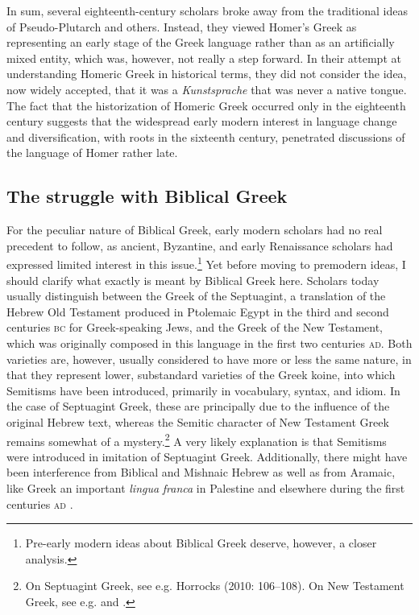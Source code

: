 \documentclass[output=paper]{langsci/langscibook}
\begin{document}
In sum, several eighteenth-century scholars broke away from the traditional ideas of Pseudo-Plutarch and others. Instead, they viewed Homer’s Greek as representing an early stage of the Greek language rather than as an artificially mixed entity, which was, however, not really a step forward. In their attempt at understanding Homeric Greek in historical terms, they did not consider the idea, now widely accepted, that it was a \textit{Kunstsprache} that was never a native tongue. The fact that the historization of Homeric Greek occurred only in the eighteenth century suggests that the widespread early modern interest in language change and diversification, with roots in the sixteenth century, penetrated discussions of the language of Homer rather late.

\subsection{The struggle with Biblical Greek}
\hypertarget{Toc19704830}{}
For the peculiar nature of Biblical Greek, early modern scholars had no real precedent to follow, as ancient, Byzantine, and early Renaissance scholars had expressed limited interest in this issue.\footnote{Pre-early modern ideas about Biblical Greek deserve, however, a closer analysis.} Yet before moving to premodern ideas, I should clarify what exactly is meant by Biblical Greek here. Scholars today usually distinguish between the Greek of the Septuagint, a translation of the Hebrew Old Testament produced in Ptolemaic Egypt in the third and second centuries \textsc{bc} for Greek-speaking Jews, and the Greek of the New Testament, which was originally composed in this language in the first two centuries \textsc{ad}. Both varieties are, however, usually considered to have more or less the same nature, in that they represent lower, substandard varieties of the Greek koine, into which Semitisms have been introduced, primarily in vocabulary, syntax, and idiom. In the case of Septuagint Greek, these are principally due to the influence of the original Hebrew text, whereas the Semitic character of New Testament Greek remains somewhat of a mystery.\footnote{On Septuagint Greek, see e.g. Horrocks (2010: 106–108). On New Testament Greek, see e.g. \citet{Janse2007} and \citet{PorterPitts2013}.} A very likely explanation is that Semitisms were introduced in imitation of Septuagint Greek. Additionally, there might have been interference from Biblical and Mishnaic Hebrew as well as from Aramaic, like Greek an important \textit{lingua} \textit{franca} in Palestine and elsewhere during the first centuries \textsc{ad} \citep{Janse2007}.
\end{document}
